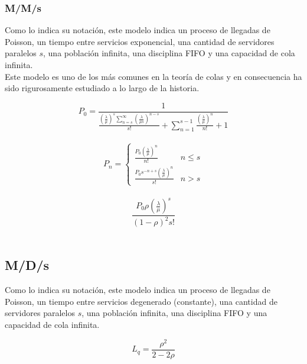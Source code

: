 \documentclass{article}
\begin{document}
\subsubsection{M/M/s}
Como lo indica su notación, este modelo indica un proceso de llegadas de Poisson,
un tiempo entre servicios exponencial, una cantidad de servidores paralelos 
$s$, una población infinita, una disciplina FIFO y una capacidad de cola infinita. \\
Este modelo es uno de los más comunes en la teoría de colas y en consecuencia ha 
sido rigurosamente estudiado a lo largo de la historia. 
\begin{Large}
\begin{equation}
	\label{eq7:p0}
	P_{0} = 
\frac{1}{\frac{\left(\frac{\lambda}{\mu}\right)^{s} \sum_{n=s}^{\infty} \left(\frac{\lambda}{\mu s}\right)^{n - s}}{s!} + \sum_{n=1}^{s - 1} \frac{\left(\frac{\lambda}{\mu}\right)^{n}}{n!} + 1} 
\end{equation}\\

\begin{equation}
	\label{eq8:pn}
	P_{n} = 
\begin{cases} 
\frac{P_{0} \left(\frac{\lambda}{\mu}\right)^{n}}{n!} & n \leq s \\\frac{P_{0} s^{- n + s} \left(\frac{\lambda}{\mu}\right)^{n}}{s!} & n > s
\end{cases}
\end{equation}\\

\begin{equation}
	\label{eq13:lqmms}
	\frac{P_{0} \rho \left(\frac{\lambda}{\mu}\right)^{s}}{\left(1 - \rho\right)^{2} s!}
\end{equation}\\
\end{Large}
\subsection{M/D/s}
Como lo indica su notación, este modelo indica un proceso de llegadas de Poisson,
un tiempo entre servicios degenerado (constante), una cantidad de servidores paralelos 
$s$, una población infinita, una disciplina FIFO y una capacidad de cola infinita. \\
\begin{Large}
\begin{equation}
	\label{eq10:lqmds}
	L_{q} = \frac{\rho^{2}}{2 - 2 \rho}
\end{equation}
\end{Large}
\end{document}
